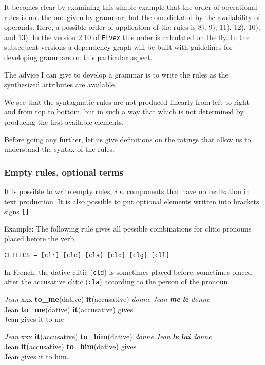 \documentclass[11pt]{article}
\begin{document}
It becomes clear by examining this simple example that the order of
operational rules is not the one given by grammar, but the one
dictated by the availability of operands. Here, a possible order of
application of the rules is 8), 9), 11), 12), 10), and 13). In
the version 2.10 of \texttt{Elvex} this order is calculated on the
fly. In the subsequent versions a dependency graph will be built with
guidelines for developing grammars on this particular aspect.

The advice I can give to develop a grammar is
to write the rules as the synthesized attributes are available.

We see that the syntagmatic rules are not produced
linearly from left to right and from top to bottom, but in such a way that
which is not determined by producing the first available elements.

Before going any further, let us give definitions on the ratings that
  allow us to understand the syntax of the rules.
  
\subsubsection*{Empty rules, optional terms}
 
It is possible to write empty rules, \textit{i.e.}  components that have no
realization in text production. It is also possible to put optional
elements written into brackets signs \verb#[]#.

Example: The following rule gives all possible combinations for clitic
pronouns placed before the verb.

\begin{lstlisting}[numbers=none]
  CLITICS → [clr] [cld] [cla] [cld] [clg] [cll] 
\end{lstlisting}

In French, the dative clitic (\texttt{cld}) is sometimes placed
before, sometimes placed after the accusative clitic (\texttt{cla})
according to the person of the pronoun.

\begin{exe}
\ex \begin{xlist} 
\ex 
\begin{tabbing}
\textit{Jean} xxx \= \textbf{to\_me}(dative) \= \textbf{it}(accusative) \= \textit{donne}\kill
\textit{Jean} \>\textit{\textbf{me}} \>\textit{\textbf{le}} \>\textit{donne}\\
Jean \> \textbf{to\_me}(dative) \> \textbf{it}(accusative) \> gives\\
Jean gives it to me\\
\end{tabbing}

\ex 
\begin{tabbing}
\textit{Jean} xxx \=\textbf{it}(accusative) \=\textbf{to\_him}(dative) \= \textit{donne}\kill
\textit{Jean} \>\textit{\textbf{le}} \>\textit{\textbf{lui}} \>\textit{donne}\\
Jean \>\textbf{it}(accusative) \>\textbf{to\_him}(dative) \>gives\\
Jean gives it to him.
\end{tabbing}
\end{xlist}
\end{exe}
 
\end{document}
